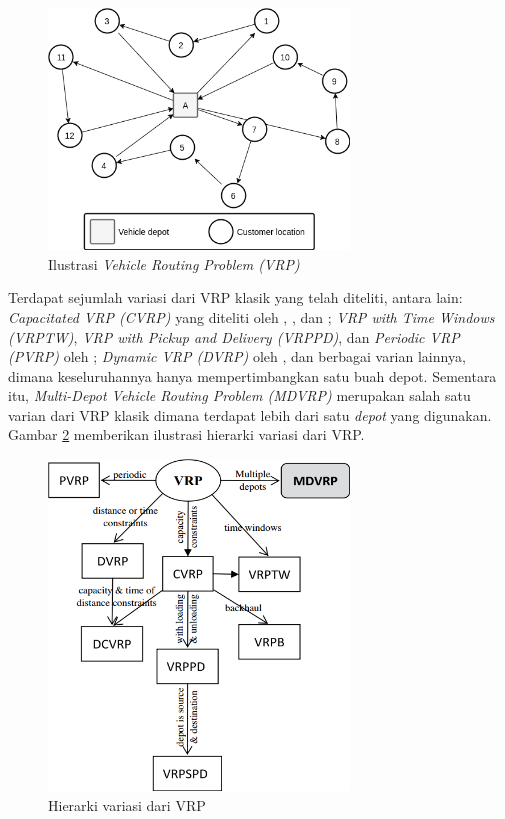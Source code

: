 \begin{figure}[!]
	\centering
	\includegraphics[width=8cm]{Resources/Images/vrp-ilustration}
	\caption{Ilustrasi \textit{Vehicle Routing Problem (VRP)}}
	\label{fig:vrp-ilustration}
\end{figure}


Terdapat sejumlah variasi dari VRP klasik yang telah diteliti, antara lain: \textit{Capacitated VRP (CVRP)} yang diteliti oleh \citep{baldacci_exact_2010}, \citep{cordeau_chapter_2007}, dan \citep{toth_vehicle_2002}; \textit{VRP with Time Windows (VRPTW)}, \textit{VRP with Pickup and Delivery (VRPPD)}, dan \textit{Periodic VRP (PVRP)} oleh \citep{solomon_survey_1988}; \textit{Dynamic VRP (DVRP)} oleh \citep{psaraftis_dynamic_1995}, dan berbagai varian lainnya, dimana keseluruhannya hanya mempertimbangkan satu buah depot. Sementara itu, \textit{Multi-Depot Vehicle Routing Problem (MDVRP)} merupakan salah satu varian dari VRP klasik dimana terdapat lebih dari satu \textit{depot} yang digunakan. Gambar \ref{fig:vrp-variants} memberikan ilustrasi hierarki variasi dari VRP.


\begin{figure}[!]
	\centering
	\includegraphics[width=8cm]{Resources/Images/vrp-variants}
	\caption{Hierarki variasi dari VRP \citep{weise_solving_2009}}
	\label{fig:vrp-variants}
\end{figure}


